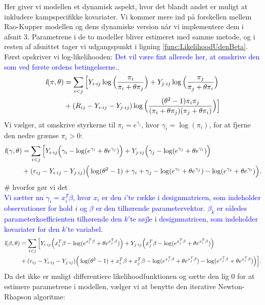 \documentclass[11pt,a4paper]{article}
\begin{document}
Her giver vi modellen et dynamisk aspekt, hvor det blandt andet er muligt at inkludere kampspecifikke kovariater. Vi kommer mere ind på forskellen mellem Rao-Kupper modellen og dens dynamiske version når vi implementere dem i afsnit 3. Parametrene i de to modeller bliver estimeret med samme metode, og i resten af afsnittet tager vi udgangspunkt i ligning \ref{func:LikelihoodUdenBeta}.
Først opskriver vi log-likelihooden: 
\textcolor{blue}{Det vil være fint allerede her, at omskrive den som ved første ordens betingelserne..}
\begin{align*}
\textit{l}(\pi,\theta)
&=\sum_{i<j}\Big{[}Y_{i\cdot ij}\log\Big{(}\frac{\pi_i}{\pi_i+\theta\pi_j}\Big{)}
+ Y_{j\cdot ij}\log\Big{(}\frac{\pi_j}{\pi_j+\theta\pi_i}\Big{)}\\
&+ (R_{ij}-Y_{i\cdot ij}-Y_{j\cdot ij}) \log\Big{(}\frac{(\theta^2-1)\pi_i \pi_j}{(\pi_i+\theta\pi_j)(\pi_j+\theta\pi_i)}\Big{)}\Big{]}
\end{align*}
Vi vælger, at omskrive styrkerne til $\pi_i=e^{\gamma_i}$, hvor $\gamma_i=\log(\pi_i)$, for at fjerne den nedre grænse $\pi_i>0$: \\
\begin{align*}
\textit{l}(\gamma,\theta)
&=\sum_{i<j}\Big{[}Y_{i\cdot ij}\Big{(}\gamma_i-\log(e^{\gamma_i}+\theta e^{\gamma_j})\Big{)}
+Y_{j\cdot ij}\Big{(}\gamma_j-\log(e^{\gamma_j}+\theta e^{\gamma_i})\Big{)}\\
& +(r_{ij}-Y_{i\cdot ij}-Y_{j\cdot ij}) \Big{(} \log(\theta^2-1)+\gamma_i+\gamma_j-\log(e^{\gamma_i}+\theta e^{\gamma_j})-\log(e^{\gamma_j}+\theta e^{\gamma_i})\Big{)}.
\end{align*}
\# hvorfor gør vi det\\
\textcolor{blue}{Vi sætter nu $\gamma_i=x_i^T\beta$, hvor $x_i$ er den $i$'te række i designmatricen, som indeholder observationer for hold $i$ og $\beta$ er den tilhørende parametervektor. $\beta_k$ er således parameterkoefficienten tilhørende den $k$'te søjle i designmatricen, som indeholder kovariater for den $k$'te variabel.}\\
\begin{align*}
\textit{l}(\beta,\theta)
&=\sum_{i<j}\Big{[}Y_{i\cdot ij}\Big{(}x_i^T\beta-\log(e^{x_i^T\beta}+\theta e^{x_j^T\beta})\Big{)}
+Y_{j\cdot ij}\Big{(}x_j^T\beta-\log(e^{x_j^T\beta}+\theta e^{x_i^T\beta})\Big{)}\\
& +(r_{ij}-Y_{i\cdot ij}-Y_{j\cdot ij}) \Big{(} \log(\theta^2-1)+x_i^T\beta+x_j^T\beta-\log(e^{x_i^T\beta}+\theta e^{x_j^T\beta})-\log(e^{x_j^T\beta}+\theta e^{x_i^T\beta})\Big{)}\Big{]}.
\end{align*}
Da det ikke er muligt differentiere likelihoodfunktionen og sætte den lig 0 for at estimere parametrene i modellen, vælger vi at benytte den iterative Newton-Rhapson algoritme:
\end{document}

